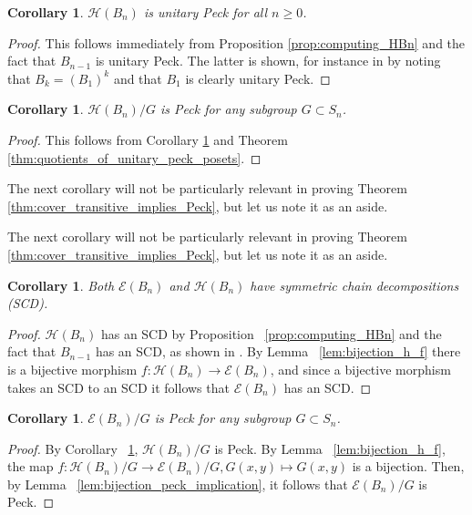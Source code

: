 \documentclass[10 pt]{amsart}
\theoremstyle{plain}
\newtheorem{cor}[thm]{Corollary}
\theoremstyle{definition}
\theoremstyle{remark}
\numberwithin{equation}{section}
\begin{document}
\begin{cor}\label{cor:HBn_unitary_peck}
$\mathcal H(B_n)$ is unitary Peck for all $n\ge 0$.
\end{cor}

\begin{proof}
This follows immediately from Proposition \ref{prop:computing_HBn} and the fact that $B_{n-1}$ is unitary Peck.  The latter is shown, for instance in \cite[Theorem 2a]{quotients_stanley} by noting that $B_k = (B_1)^k$ and that $B_1$ is clearly unitary Peck.
\end{proof}

\begin{cor}\label{cor:quotients_of_HBn_peck}
$\mathcal H(B_n)/G$ is Peck for any subgroup $G\subset S_n$.
\end{cor}

\begin{proof}
This follows from Corollary \ref{cor:HBn_unitary_peck} and Theorem \ref{thm:quotients_of_unitary_peck_posets}.
\end{proof}

The next corollary will not be particularly relevant in proving Theorem \ref{thm:cover_transitive_implies_Peck}, but let us note it as an aside.

The next corollary will not be particularly relevant in proving Theorem \ref{thm:cover_transitive_implies_Peck}, but let us note it as an aside.

\begin{cor}
Both $\mathcal{E}(B_n)$ and $\mathcal H(B_n)$ have symmetric chain decompositions (SCD).
\end{cor}


\begin{proof}
$\mathcal{H}(B_n)$ has an SCD by Proposition ~\ref{prop:computing_HBn} and the fact that $B_{n-1}$ has an SCD, as shown in \cite{greene}.  By Lemma ~\ref{lem:bijection_h_f} there is a bijective morphism $f\colon\mathcal{H}(B_n)\rightarrow\mathcal{E}(B_n)$, and since a bijective morphism takes an SCD to an SCD it follows that $\mathcal{E}(B_n)$ has an SCD.
\end{proof}


\begin{cor}
\label{cor:quotiented_edge_peck}
$\mathcal E(B_n)/G$ is Peck for any subgroup $G\subset S_n$.
\end{cor}
\begin{proof}
By Corollary ~\ref{cor:quotients_of_HBn_peck}, $\mathcal H(B_n)/G$ is Peck. By Lemma ~\ref{lem:bijection_h_f}, the map $f:\mathcal H(B_n)/G \rightarrow \mathcal E(B_n)/G,G(x, y) \mapsto G(x, y)$ is a bijection. Then, by Lemma ~\ref{lem:bijection_peck_implication}, it follows that $\mathcal E(B_n)/G$ is Peck.
\end{proof}
\end{document}
